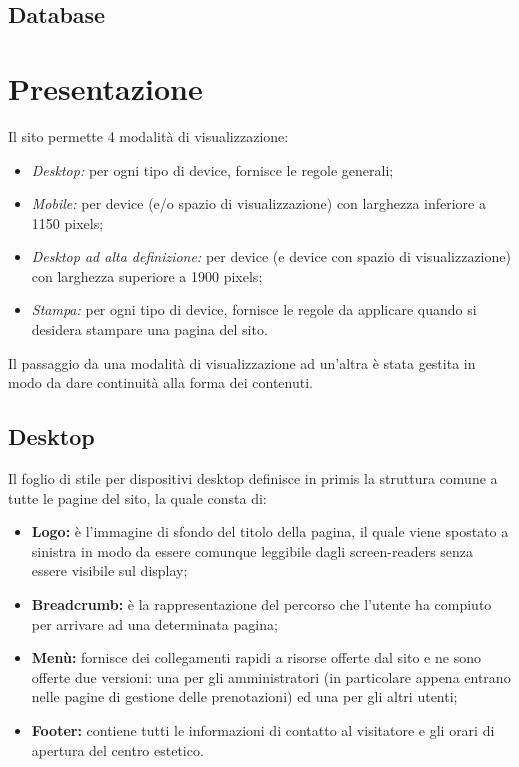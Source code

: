 \documentclass[]{article}
\begin{document}
\subsection{Database}

\section{Presentazione}
Il sito permette 4 modalità di visualizzazione:
\begin{itemize}
	\item \textit{Desktop:} per ogni tipo di device, fornisce le regole generali;
	\item \textit{Mobile:} per device (e/o spazio di visualizzazione) con larghezza inferiore a 1150 pixels;
	\item \textit{Desktop ad alta definizione:} per device (e device con spazio di visualizzazione) con larghezza superiore a 1900 pixels;
	\item \textit{Stampa:} per ogni tipo di device, fornisce le regole da applicare quando si desidera stampare una pagina del sito.
\end{itemize}
Il passaggio da una modalità di visualizzazione ad un'altra è stata gestita in modo da dare continuità alla forma dei contenuti.

\subsection{Desktop}
Il foglio di stile per dispositivi desktop definisce in primis la struttura comune a tutte le pagine del sito, la quale consta di:
\begin{itemize}
	\item \textbf{Logo:} è l'immagine di sfondo del titolo della pagina, il quale viene spostato a sinistra in modo da essere comunque leggibile dagli screen-readers senza essere visibile sul display;
	\item \textbf{Breadcrumb:} è la rappresentazione del percorso che l'utente ha compiuto per arrivare ad una determinata pagina;
	\item \textbf{Menù:} fornisce dei collegamenti rapidi a risorse offerte dal sito e ne sono offerte due versioni: una per gli amministratori (in particolare appena entrano nelle pagine di gestione delle prenotazioni) ed una per gli altri utenti;
	\item \textbf{Footer:} contiene tutti le informazioni di contatto al visitatore e gli orari di apertura del centro estetico.
\end{itemize}
\end{document}
